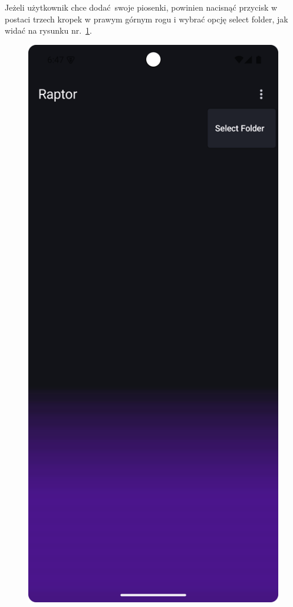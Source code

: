 Jeżeli użytkownik chce dodać swoje piosenki, powinien nacisnąć przycisk w postaci trzech kropek w prawym górnym rogu i wybrać opcję select folder, jak widać na rysunku nr.~\ref{fig:tutorial_select_folder}.

\begin{figure}[H]
	\centering
	\includegraphics[width=1\textwidth]{images/tutorial_select_folder.png}
	\caption{}
	\label{fig:tutorial_select_folder}
\end{figure}

